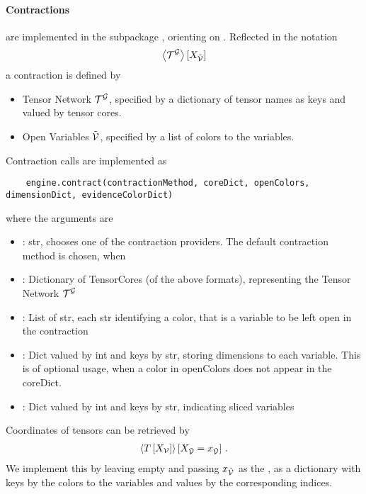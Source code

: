 \paragraph{Contractions} are implemented in the subpackage \spengine, orienting on .
Reflected in the notation
\begin{align*}
	\left\langle \mathcal{T}^{\mathcal{G}}\right\rangle \left[ X_{\tilde{\mathcal{V}}} \right]
\end{align*}
a contraction is defined by
\begin{itemize}
	\item Tensor Network $\mathcal{T}^{\mathcal{G}}$, specified by a dictionary of tensor names as keys and valued by tensor cores.
	\item Open Variables $\tilde{\mathcal{V}}$, specified by a list of colors to the variables.
\end{itemize}
Contraction calls are implemented as
\begin{lstlisting}
	engine.contract(contractionMethod, coreDict, openColors, dimensionDict, evidenceColorDict)
\end{lstlisting}
where the arguments are
\begin{itemize}
	\item {}: str, chooses one of the contraction providers. The default contraction method  is chosen, when
	\item {}: Dictionary of TensorCores (of the above formats), representing the Tensor Network $\mathcal{T}^{\mathcal{G}}$
	\item {}: List of str, each str identifying a color, that is a variable to be left open in the contraction
	\item {}: Dict valued by int and keys by str, storing dimensions to each variable. This is of optional usage, when a color in openColors does not appear in the coreDict.
	\item {}: Dict valued by int and keys by str, indicating sliced variables
\end{itemize}

Coordinates of tensors can be retrieved by
\begin{align*}
	\left\langle T\left[X_{\mathcal{V}}\right]\right\rangle \left[ X_{\tilde{\mathcal{V}}}=x_{\tilde{\mathcal{V}}} \right] \, .
\end{align*}
We implement this by leaving  empty and passing $x_{\tilde{\mathcal{V}}}$ as the , as a dictionary with keys by the  colors to the variables and values by the corresponding  indices.

